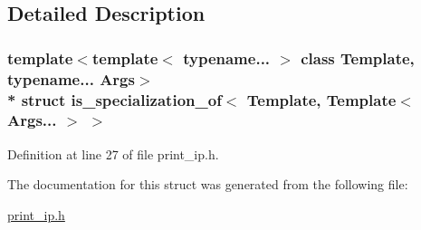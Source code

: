 \subsection{Detailed Description}
\subsubsection*{template$<$template$<$ typename... $>$ class Template, typename... Args$>$\\*
struct is\+\_\+specialization\+\_\+of$<$ Template, Template$<$ Args... $>$ $>$}



Definition at line 27 of file print\+\_\+ip.\+h.



The documentation for this struct was generated from the following file\+:\begin{DoxyCompactItemize}
\item 
\hyperlink{print__ip_8h}{print\+\_\+ip.\+h}\end{DoxyCompactItemize}
